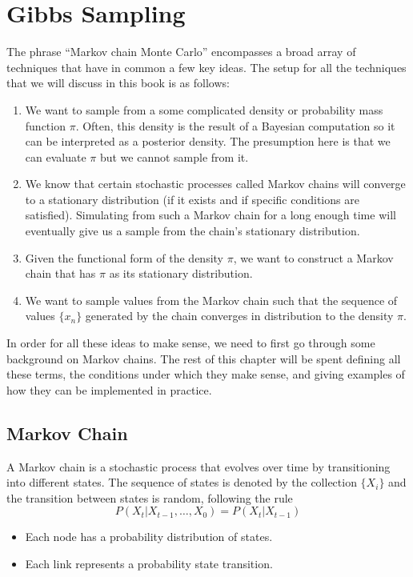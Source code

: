 \section{Gibbs Sampling}

The phrase ``Markov chain Monte Carlo'' encompasses a broad array of techniques that have in common a few key ideas. The setup for all the techniques that we will discuss in this book is as follows:

\begin{enumerate}
	\item We want to sample from a some complicated density or probability mass function $\pi$. Often, this density is the result of a Bayesian computation so it can be interpreted as a posterior density. The presumption here is that we can evaluate $\pi$ but we cannot sample from it.
	\item We know that certain stochastic processes called Markov chains will converge to a stationary distribution (if it exists and if specific conditions are satisfied). Simulating from such a Markov chain for a long enough time will eventually give us a sample from the chain’s stationary distribution.
	\item Given the functional form of the density $\pi$, we want to construct a Markov chain that has $\pi$ as its stationary distribution.
	\item We want to sample values from the Markov chain such that the sequence of values $\{x_n\}$ generated by the chain converges in distribution to the density $\pi$.
\end{enumerate}

In order for all these ideas to make sense, we need to first go through some background on Markov chains. The rest of this chapter will be spent defining all these terms, the conditions under which they make sense, and giving examples of how they can be implemented in practice.

\subsection{Markov Chain}

A Markov chain is a stochastic process that evolves over time by transitioning into different states. The sequence of states is denoted by the collection $\{X_i\}$ and the transition between states is random, following the rule 
$$P(X_t|X_{t-1},\dots,X_0)=P(X_t|X_{t-1})$$

\begin{itemize}
	\item Each node has a probability distribution of states.
	\item Each link represents a probability state transition.  
\end{itemize}

